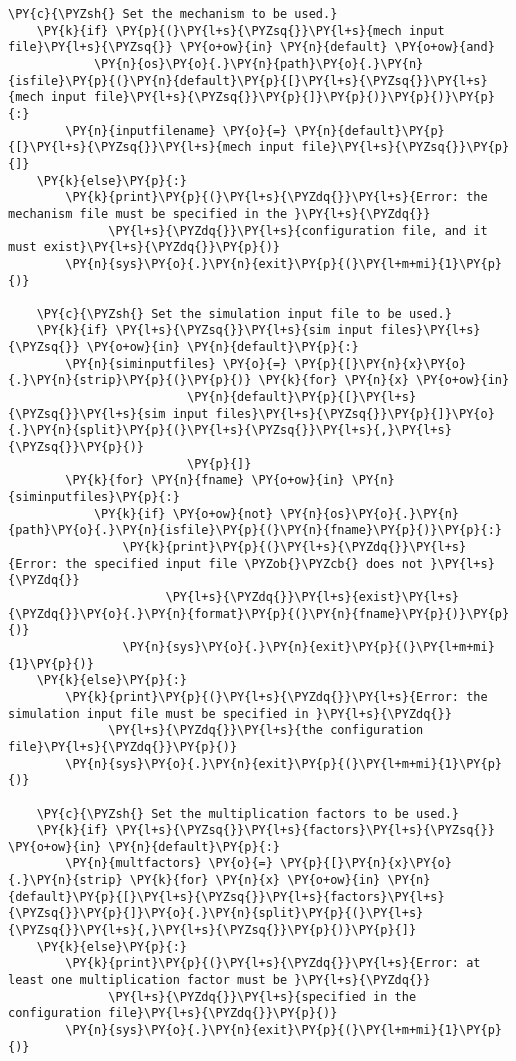\begin{Verbatim}[commandchars=\\\{\}]
    \PY{c}{\PYZsh{} Set the mechanism to be used.}
    \PY{k}{if} \PY{p}{(}\PY{l+s}{\PYZsq{}}\PY{l+s}{mech input file}\PY{l+s}{\PYZsq{}} \PY{o+ow}{in} \PY{n}{default} \PY{o+ow}{and}
            \PY{n}{os}\PY{o}{.}\PY{n}{path}\PY{o}{.}\PY{n}{isfile}\PY{p}{(}\PY{n}{default}\PY{p}{[}\PY{l+s}{\PYZsq{}}\PY{l+s}{mech input file}\PY{l+s}{\PYZsq{}}\PY{p}{]}\PY{p}{)}\PY{p}{)}\PY{p}{:}
        \PY{n}{inputfilename} \PY{o}{=} \PY{n}{default}\PY{p}{[}\PY{l+s}{\PYZsq{}}\PY{l+s}{mech input file}\PY{l+s}{\PYZsq{}}\PY{p}{]}
    \PY{k}{else}\PY{p}{:}
        \PY{k}{print}\PY{p}{(}\PY{l+s}{\PYZdq{}}\PY{l+s}{Error: the mechanism file must be specified in the }\PY{l+s}{\PYZdq{}}
              \PY{l+s}{\PYZdq{}}\PY{l+s}{configuration file, and it must exist}\PY{l+s}{\PYZdq{}}\PY{p}{)}
        \PY{n}{sys}\PY{o}{.}\PY{n}{exit}\PY{p}{(}\PY{l+m+mi}{1}\PY{p}{)}

    \PY{c}{\PYZsh{} Set the simulation input file to be used.}
    \PY{k}{if} \PY{l+s}{\PYZsq{}}\PY{l+s}{sim input files}\PY{l+s}{\PYZsq{}} \PY{o+ow}{in} \PY{n}{default}\PY{p}{:}
        \PY{n}{siminputfiles} \PY{o}{=} \PY{p}{[}\PY{n}{x}\PY{o}{.}\PY{n}{strip}\PY{p}{(}\PY{p}{)} \PY{k}{for} \PY{n}{x} \PY{o+ow}{in}
                         \PY{n}{default}\PY{p}{[}\PY{l+s}{\PYZsq{}}\PY{l+s}{sim input files}\PY{l+s}{\PYZsq{}}\PY{p}{]}\PY{o}{.}\PY{n}{split}\PY{p}{(}\PY{l+s}{\PYZsq{}}\PY{l+s}{,}\PY{l+s}{\PYZsq{}}\PY{p}{)}
                         \PY{p}{]}
        \PY{k}{for} \PY{n}{fname} \PY{o+ow}{in} \PY{n}{siminputfiles}\PY{p}{:}
            \PY{k}{if} \PY{o+ow}{not} \PY{n}{os}\PY{o}{.}\PY{n}{path}\PY{o}{.}\PY{n}{isfile}\PY{p}{(}\PY{n}{fname}\PY{p}{)}\PY{p}{:}
                \PY{k}{print}\PY{p}{(}\PY{l+s}{\PYZdq{}}\PY{l+s}{Error: the specified input file \PYZob{}\PYZcb{} does not }\PY{l+s}{\PYZdq{}}
                      \PY{l+s}{\PYZdq{}}\PY{l+s}{exist}\PY{l+s}{\PYZdq{}}\PY{o}{.}\PY{n}{format}\PY{p}{(}\PY{n}{fname}\PY{p}{)}\PY{p}{)}
                \PY{n}{sys}\PY{o}{.}\PY{n}{exit}\PY{p}{(}\PY{l+m+mi}{1}\PY{p}{)}
    \PY{k}{else}\PY{p}{:}
        \PY{k}{print}\PY{p}{(}\PY{l+s}{\PYZdq{}}\PY{l+s}{Error: the simulation input file must be specified in }\PY{l+s}{\PYZdq{}}
              \PY{l+s}{\PYZdq{}}\PY{l+s}{the configuration file}\PY{l+s}{\PYZdq{}}\PY{p}{)}
        \PY{n}{sys}\PY{o}{.}\PY{n}{exit}\PY{p}{(}\PY{l+m+mi}{1}\PY{p}{)}

    \PY{c}{\PYZsh{} Set the multiplication factors to be used.}
    \PY{k}{if} \PY{l+s}{\PYZsq{}}\PY{l+s}{factors}\PY{l+s}{\PYZsq{}} \PY{o+ow}{in} \PY{n}{default}\PY{p}{:}
        \PY{n}{multfactors} \PY{o}{=} \PY{p}{[}\PY{n}{x}\PY{o}{.}\PY{n}{strip} \PY{k}{for} \PY{n}{x} \PY{o+ow}{in} \PY{n}{default}\PY{p}{[}\PY{l+s}{\PYZsq{}}\PY{l+s}{factors}\PY{l+s}{\PYZsq{}}\PY{p}{]}\PY{o}{.}\PY{n}{split}\PY{p}{(}\PY{l+s}{\PYZsq{}}\PY{l+s}{,}\PY{l+s}{\PYZsq{}}\PY{p}{)}\PY{p}{]}
    \PY{k}{else}\PY{p}{:}
        \PY{k}{print}\PY{p}{(}\PY{l+s}{\PYZdq{}}\PY{l+s}{Error: at least one multiplication factor must be }\PY{l+s}{\PYZdq{}}
              \PY{l+s}{\PYZdq{}}\PY{l+s}{specified in the configuration file}\PY{l+s}{\PYZdq{}}\PY{p}{)}
        \PY{n}{sys}\PY{o}{.}\PY{n}{exit}\PY{p}{(}\PY{l+m+mi}{1}\PY{p}{)}


\end{Verbatim}
